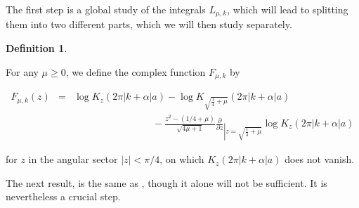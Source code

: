 \documentclass{jams-l}
\theoremstyle{definition}
\newtheorem{definition}[theorem]{Definition}
\theoremstyle{remark}
\numberwithin{equation}{section}
\begin{document}
            The first step is a global study of the integrals $L_{\mu,k}$, which will lead to splitting them into two different parts, which we will then study separately.
        
            \begin{definition}
            \label{DefFmuk}
        
                For any $\mu \geqslant 0$, we define the complex function $F_{\mu,k}$ by
            
                \[ \begin{array}{lll}
                        F_{\mu,k} \left( z \right) & = & \log K_z \left( 2 \pi \left \vert k + \alpha \right \vert a \right) - \log K_{\sqrt{\frac{1}{4} + \mu}} \left( 2 \pi \left \vert k + \alpha \right \vert a \right) \\[1em]
                    
                        && \qquad \qquad \qquad \qquad - \frac{z^2 - \left( 1/4 + \mu \right)}{\sqrt{4 \mu + 1}} \frac{\partial}{\partial z}_{\left \vert z = \sqrt{\frac{1}{4} + \mu} \right.} \log K_z \left( 2 \pi \left \vert k + \alpha \right \vert a \right)
                    \end{array} \]
                
                \noindent for $z$ in the angular sector $\left \vert z \right \vert < \pi / 4$, on which $K_z \left( 2 \pi \left \vert k + \alpha \right \vert a \right)$ does not vanish.
        
            \end{definition}
        
            The next result, is the same as \cite[Cor. 6.4]{MR4167014}, though it alone will not be sufficient. It is nevertheless a crucial step.
        
\end{document}
